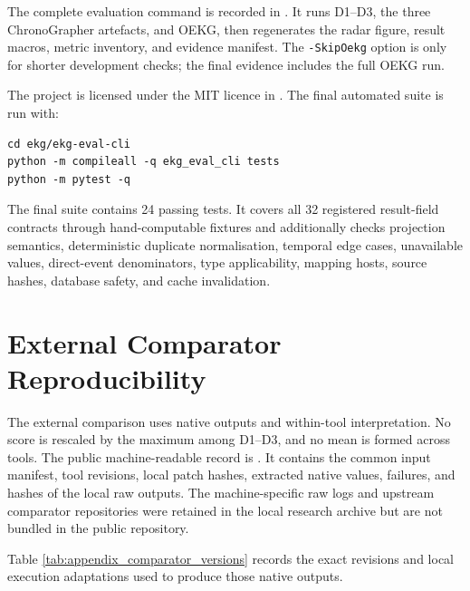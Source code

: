 The complete evaluation command is recorded in . It runs D1--D3, the three ChronoGrapher artefacts, and OEKG, then regenerates the radar figure, result macros, metric inventory, and evidence manifest. The \texttt{-SkipOekg} option is only for shorter development checks; the final evidence includes the full OEKG run.

The project is licensed under the MIT licence in . The final automated suite is run with:

\begin{verbatim}
cd ekg/ekg-eval-cli
python -m compileall -q ekg_eval_cli tests
python -m pytest -q
\end{verbatim}

The final suite contains 24 passing tests. It covers all 32 registered result-field contracts through hand-computable fixtures and additionally checks projection semantics, deterministic duplicate normalisation, temporal edge cases, unavailable values, direct-event denominators, type applicability, mapping hosts, source hashes, database safety, and cache invalidation.

\section{External Comparator Reproducibility}
\label{app:comparator_reproducibility}

The external comparison uses native outputs and within-tool interpretation. No score is rescaled by the maximum among D1--D3, and no mean is formed across tools. The public machine-readable record is . It contains the common input manifest, tool revisions, local patch hashes, extracted native values, failures, and hashes of the local raw outputs. The machine-specific raw logs and upstream comparator repositories were retained in the local research archive but are not bundled in the public repository.

Table \ref{tab:appendix_comparator_versions} records the exact revisions and local execution adaptations used to produce those native outputs.

